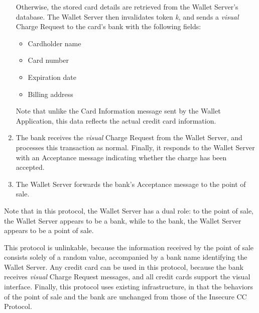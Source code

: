 \begin{enumerate}
    Otherwise, the stored card details are retrieved from the Wallet Server's database.
    The Wallet Server then invalidates token \emph{k}, and sends a \emph{visual} Charge Request to the card's bank with the following fields:
    \begin{itemize}
    \item Cardholder name
    \item Card number
    \item Expiration date
    \item Billing address
    \end{itemize}
    Note that unlike the Card Information message sent by the Wallet Application, this data reflects the actual credit card information.
\item The bank receives the \emph{visual} Charge Request from the Wallet Server,
    and processes this transaction as normal.
    Finally, it responds to the Wallet Server with an Acceptance message indicating whether the charge has been accepted.
\item The Wallet Server forwards the bank's Acceptance message to the point of sale.
\end{enumerate}

Note that in this protocol, the Wallet Server has a dual role:
to the point of sale, the Wallet Server appears to be a bank, while to the bank, the Wallet Server appears to be a point of sale.

This protocol is unlinkable,
    because the information received by the point of sale consists solely of a random value, accompanied by a bank name identifying the Wallet Server.
Any credit card can be used in this protocol,
    because the bank receives \emph{visual} Charge Request messages, and all credit cards support the visual interface.
Finally, this protocol uses existing infrastructure,
    in that the behaviors of the point of sale and the bank are unchanged from those of the Insecure CC Protocol.
